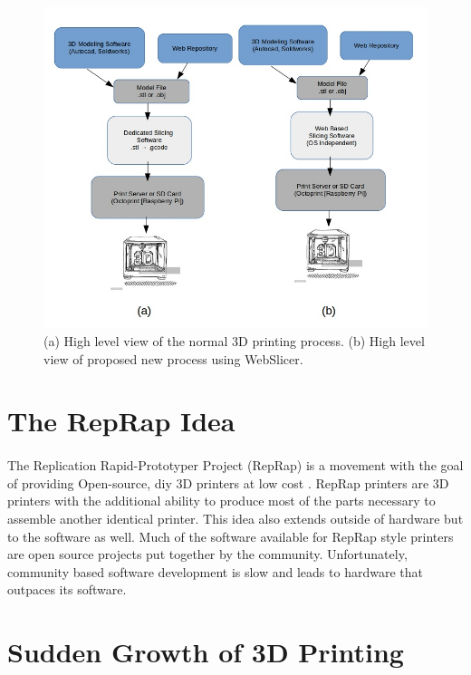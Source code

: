 \begin{figure}[!ht]
  \centering
  \includegraphics[width=\linewidth]{diagrams/basic-process-3D-printing}
  \caption{(a) High level view of the normal 3D printing process. (b) High level view of proposed new process using WebSlicer.}
\end{figure}


\section{The RepRap Idea}
\paragraph{}
The Replication Rapid-Prototyper Project (RepRap) is a movement with the goal of providing Open-source, diy 3D printers at low cost \citep{reprap-2011}.
RepRap printers are 3D printers with the additional ability to produce most of the parts necessary to assemble another identical printer.
This idea also extends outside of hardware but to the software as well.
Much of the software available for RepRap style printers are open source projects put together by the community.
Unfortunately, community based software development is slow and leads to hardware that outpaces its software.

\section{Sudden Growth of 3D Printing}
